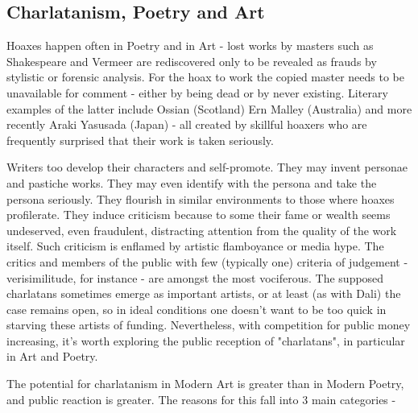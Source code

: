 \documentclass[11pt]{article}
\begin{document}
\newpage\subsection{Charlatanism, Poetry and Art}

Hoaxes happen often in Poetry and in Art - lost works by masters 
such as Shakespeare and Vermeer are rediscovered only to be revealed
as frauds by stylistic or forensic analysis. For the hoax to work the copied
master needs to be unavailable for comment - either by being dead or
by never existing. Literary examples of the latter include Ossian (Scotland)
Ern Malley (Australia) and more recently Araki Yasusada (Japan) - all created
by skillful hoaxers who are frequently surprised that their work is taken seriously.



Writers too develop their characters and self-promote. They may invent 
personae and pastiche works. They may even
identify with the persona and take the persona seriously. They 
flourish in similar environments to those where hoaxes profilerate.
They induce criticism because to some their fame or wealth seems undeserved,
even fraudulent, distracting attention from the quality of the work itself.
Such criticism is enflamed by artistic flamboyance or media hype. The critics
and members of the public  
with few (typically one) criteria of judgement - verisimilitude, for instance -
are amongst the most vociferous. The supposed charlatans sometimes emerge as
important artists, or at least (as with Dali) the case remains open, so in
ideal conditions one doesn't want to be too quick in starving these artists of
funding. Nevertheless, with competition for public money increasing,
it's worth exploring the public reception of "charlatans", in particular 
in Art and Poetry.


 
The potential for charlatanism in Modern Art is greater than in Modern
Poetry, and public reaction is greater. The reasons for this fall into
3 main categories -
\end{document}
